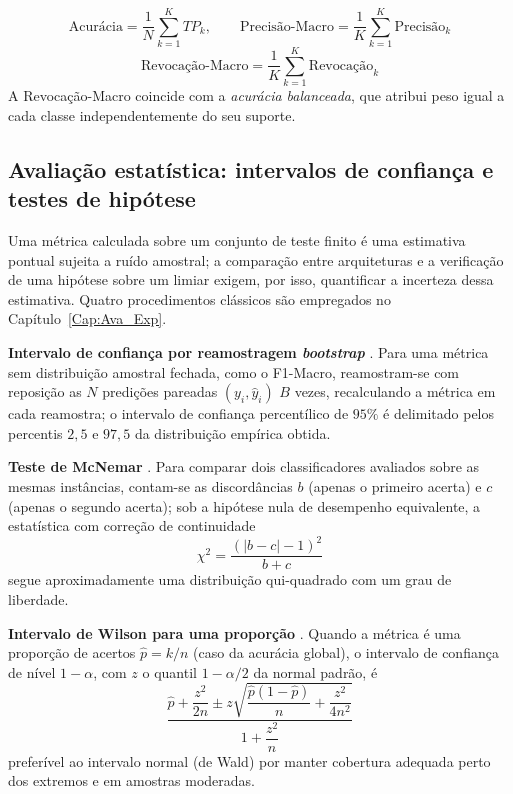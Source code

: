\begin{equation}
	\label{eq:acuracia}
	\text{Acurácia} = \frac{1}{N} \sum_{k=1}^{K} TP_k, \qquad
	\text{Precisão-Macro} = \frac{1}{K} \sum_{k=1}^{K} \text{Precisão}_k
\end{equation}
\begin{equation}
	\label{eq:revocacao_macro}
	\text{Revocação-Macro} = \frac{1}{K} \sum_{k=1}^{K} \text{Revocação}_k
\end{equation}
A Revocação-Macro coincide com a \textit{acurácia balanceada}, que atribui peso igual a cada classe independentemente do seu suporte.

\subsection{Avaliação estatística: intervalos de confiança e testes de hipótese}
\label{sec:fund_estatistica}
Uma métrica calculada sobre um conjunto de teste finito é uma estimativa pontual sujeita a ruído amostral; a comparação entre arquiteturas e a verificação de uma hipótese sobre um limiar exigem, por isso, quantificar a incerteza dessa estimativa. Quatro procedimentos clássicos são empregados no Capítulo~\ref{Cap:Ava_Exp}.

\textbf{Intervalo de confiança por reamostragem \textit{bootstrap}} \cite{efron1979bootstrap}. Para uma métrica sem distribuição amostral fechada, como o F1-Macro, reamostram-se com reposição as $N$ predições pareadas $(y_i, \hat{y}_i)$ $B$ vezes, recalculando a métrica em cada reamostra; o intervalo de confiança percentílico de $95\%$ é delimitado pelos percentis $2{,}5$ e $97{,}5$ da distribuição empírica obtida.

\textbf{Teste de McNemar} \cite{mcnemar1947note}. Para comparar dois classificadores avaliados sobre as mesmas instâncias, contam-se as discordâncias $b$ (apenas o primeiro acerta) e $c$ (apenas o segundo acerta); sob a hipótese nula de desempenho equivalente, a estatística com correção de continuidade
\begin{equation}
	\label{eq:mcnemar}
	\chi^2 = \frac{(|b - c| - 1)^2}{b + c}
\end{equation}
segue aproximadamente uma distribuição qui-quadrado com um grau de liberdade.

\textbf{Intervalo de Wilson para uma proporção} \cite{wilson1927probable}. Quando a métrica é uma proporção de acertos $\hat{p} = k/n$ (caso da acurácia global), o intervalo de confiança de nível $1 - \alpha$, com $z$ o quantil $1 - \alpha/2$ da normal padrão, é
\begin{equation}
	\label{eq:wilson}
	\frac{\hat{p} + \dfrac{z^2}{2n} \pm z \sqrt{\dfrac{\hat{p}(1 - \hat{p})}{n} + \dfrac{z^2}{4n^2}}}{1 + \dfrac{z^2}{n}}
\end{equation}
preferível ao intervalo normal (de Wald) por manter cobertura adequada perto dos extremos e em amostras moderadas.

